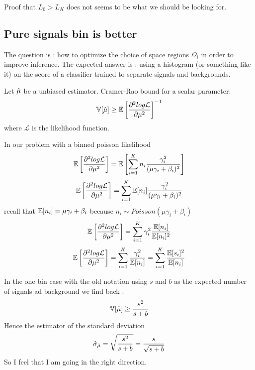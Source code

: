 Proof that $L_0 > L_K$ does not seems to be what we should be looking for.





\subsection{Pure signals bin is better}


The question is : how to optimize the choice of space regions $\Omega_i$ in order to improve inference.
The expected answer is : using a histogram (or something like it) on the score of a classifier trained to separate signals and backgrounds.


Let $\hat\mu$ be a unbiased estimator.
Cramer-Rao bound for a scalar parameter:
\begin{equation}
    \mathbb{V}[\hat\mu] \geq \mathbb{E} \left [ \frac{\partial^2 log \mathcal L}{\partial \mu^2}  \right ]^{-1}
\end{equation}
where $\mathcal L$ is the likelihood function.

In our problem with a binned poisson likelihood
\begin{equation}
    \mathbb{E} \left [ \frac{\partial^2 log \mathcal L}{\partial \mu^2}  \right ] = \mathbb{E} \left[ \sum_{i=1}^K n_i \frac{\gamma_i^2}{(\mu \gamma_i + \beta_i)^2}  \right ]
\end{equation}
\begin{equation}
    \mathbb{E} \left [ \frac{\partial^2 log \mathcal L}{\partial \mu^2}  \right ] = \sum_{i=1}^K \mathbb{E}[n_i] \frac{\gamma_i^2}{(\mu \gamma_i + \beta_i)^2}
\end{equation}
recall that $\mathbb{E}[n_i] = \mu \gamma_i + \beta_i$ because $n_i \sim Poisson(\mu \gamma_i + \beta_i)$ 
\begin{equation}
    \mathbb{E} \left [ \frac{\partial^2 log \mathcal L}{\partial \mu^2}  \right ] = \sum_{i=1}^K  \gamma_i^2 \frac{\mathbb{E}[n_i]}{\mathbb{E}[n_i]^2}
\end{equation}
\begin{equation}
    \mathbb{E} \left [ \frac{\partial^2 log \mathcal L}{\partial \mu^2}  \right ] = \sum_{i=1}^K  \frac{\gamma_i^2}{\mathbb{E}[n_i]} = \sum_{i=1}^K  \frac{\mathbb{E}[s_i]^2}{\mathbb{E}[n_i]}
\end{equation}

In the one bin case with the old notation using $s$ and $b$ as the expected number of signals ad background we find back :
\begin{equation}
    \mathbb{V}[\hat\mu] \geq \frac{s^2}{s+b} 
\end{equation}
Hence the estimator of the standard deviation 
\begin{equation}
    \hat\sigma_{\hat\mu} = \sqrt{\frac{s^2}{s+b}} = \frac{s}{\sqrt{s+b}} 
\end{equation}
So I feel that I am going in the right direction.

